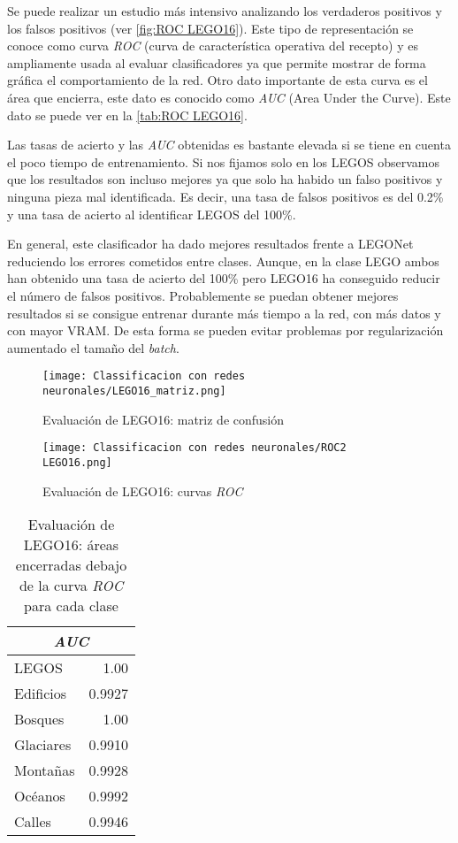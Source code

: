 Se puede realizar un estudio más intensivo analizando los verdaderos positivos y los falsos positivos (ver \autoref{fig:ROC LEGO16}). Este tipo de representación se conoce como curva \textit{ROC} (curva de característica operativa del recepto) y es ampliamente usada al evaluar clasificadores ya que permite mostrar de forma gráfica el comportamiento de la red. Otro dato importante de esta curva es el área que encierra, este dato es conocido como \textit{AUC} (Area Under the Curve). Este dato se puede ver en la \autoref{tab:ROC LEGO16}.

Las tasas de acierto y las \textit{AUC} obtenidas es bastante elevada si se tiene en cuenta el poco tiempo de entrenamiento. Si nos fijamos solo en los LEGOS observamos que los resultados son incluso mejores ya que solo ha habido un falso positivos y ninguna pieza mal identificada. Es decir, una tasa de falsos positivos es del 0.2\% y una tasa de acierto al identificar LEGOS del 100\%.

En general, este clasificador ha dado mejores resultados frente a LEGONet reduciendo los errores cometidos entre clases. Aunque, en la clase LEGO ambos han obtenido una tasa de acierto del 100\% pero LEGO16 ha conseguido reducir el número de falsos positivos. Probablemente se puedan obtener mejores resultados si se consigue entrenar durante más tiempo a la red, con más datos y con mayor VRAM. De esta forma se pueden evitar problemas por regularización aumentado el tamaño del \textit{batch}.

\begin{figure}[ht]  %
	\centering
	\texttt{[image: Classificacion con redes neuronales/LEGO16\_matriz.png]}
	\caption{Evaluación de LEGO16: matriz de confusión}
	\label{fig:matriz LEGO16}
\end{figure}

\begin{figure}[ht]  %
	\centering
	\texttt{[image: Classificacion con redes neuronales/ROC2 LEGO16.png]}
	\caption{Evaluación de LEGO16: curvas \textit{ROC}}
	\label{fig:ROC LEGO16}
\end{figure}

\begin{table}[ht]
  \centering
    \begin{tabular}{|l|r|}
    \hline
    \multicolumn{2}{|c|}{\textit{AUC}}\\
    \hline
    LEGOS & 1.00 \\
    \hline
    Edificios & 0.9927 \\
    \hline
    Bosques & 1.00 \\
    \hline
    Glaciares & 0.9910 \\
    \hline
    Montañas & 0.9928 \\
    \hline
    Océanos & 0.9992 \\
    \hline
    Calles & 0.9946 \\
    \hline
    \end{tabular}%
    \caption{Evaluación de LEGO16: áreas encerradas debajo de la curva \textit{ROC} para cada clase}
  \label{tab:ROC LEGO16}%
\end{table}%
